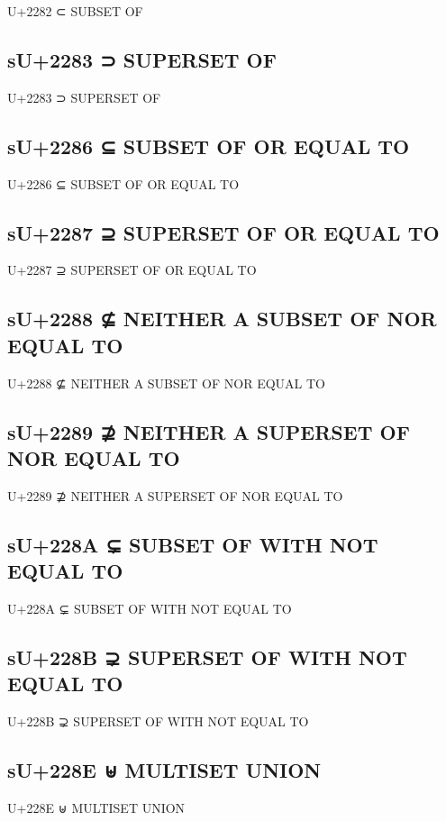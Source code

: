 U+2282 ⊂ SUBSET OF

\subsection{sU+2283 ⊃ SUPERSET OF}

U+2283 ⊃ SUPERSET OF

\subsection{sU+2286 ⊆ SUBSET OF OR EQUAL TO}

U+2286 ⊆ SUBSET OF OR EQUAL TO

\subsection{sU+2287 ⊇ SUPERSET OF OR EQUAL TO}

U+2287 ⊇ SUPERSET OF OR EQUAL TO

\subsection{sU+2288 ⊈ NEITHER A SUBSET OF NOR EQUAL TO}

U+2288 ⊈ NEITHER A SUBSET OF NOR EQUAL TO

\subsection{sU+2289 ⊉ NEITHER A SUPERSET OF NOR EQUAL TO}

U+2289 ⊉ NEITHER A SUPERSET OF NOR EQUAL TO

\subsection{sU+228A ⊊ SUBSET OF WITH NOT EQUAL TO}

U+228A ⊊ SUBSET OF WITH NOT EQUAL TO

\subsection{sU+228B ⊋ SUPERSET OF WITH NOT EQUAL TO}

U+228B ⊋ SUPERSET OF WITH NOT EQUAL TO

\subsection{sU+228E ⊎ MULTISET UNION}

U+228E ⊎ MULTISET UNION

